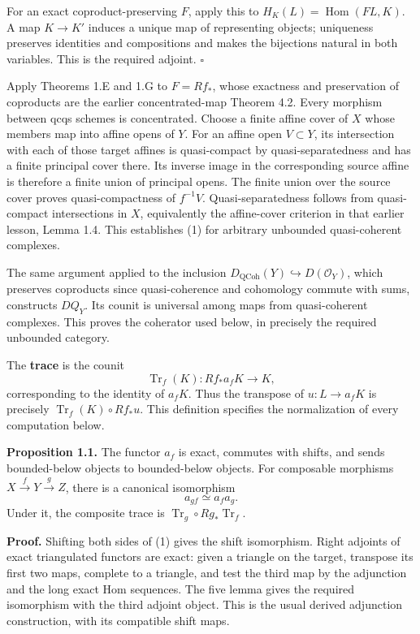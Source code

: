 \documentclass[11pt]{article}
\begin{document}
For an exact coproduct-preserving \(F\), apply this to
\(H_K(L)=\operatorname{Hom}(FL,K)\). A map \(K\to K'\) induces a unique
map of representing objects; uniqueness preserves identities and
compositions and makes the bijections natural in both variables. This is
the required adjoint. \(\square\)

Apply Theorems 1.E and 1.G to \(F=Rf_*\), whose exactness and
preservation of coproducts are the earlier concentrated-map Theorem 4.2.
Every morphism between qcqs schemes is concentrated. Choose a finite
affine cover of \(X\) whose members map into affine opens of \(Y\). For
an affine open \(V\subset Y\), its intersection with each of those
target affines is quasi-compact by quasi-separatedness and has a finite
principal cover there. Its inverse image in the corresponding source
affine is therefore a finite union of principal opens. The finite union
over the source cover proves quasi-compactness of \(f^{-1}V\).
Quasi-separatedness follows from quasi-compact intersections in \(X\),
equivalently the affine-cover criterion in that earlier lesson, Lemma
1.4. This establishes (1) for arbitrary unbounded quasi-coherent
complexes.

The same argument applied to the inclusion
\(D_{\mathrm{QCoh}}(Y)\hookrightarrow D(\mathcal O_Y)\), which preserves
coproducts since quasi-coherence and cohomology commute with sums,
constructs \(DQ_Y\). Its counit is universal among maps from
quasi-coherent complexes. This proves the coherator used below, in
precisely the required unbounded category.

The \textbf{trace} is the counit \[
\operatorname{Tr}_f(K):Rf_*a_fK\longrightarrow K,
\tag{2}
\] corresponding to the identity of \(a_fK\). Thus the transpose of
\(u:L\to a_fK\) is precisely \(\operatorname{Tr}_f(K)\circ Rf_*u\). This
definition specifies the normalization of every computation below.

\textbf{Proposition 1.1.} The functor \(a_f\) is exact, commutes with
shifts, and sends bounded-below objects to bounded-below objects. For
composable morphisms \(X\xrightarrow fY\xrightarrow gZ\), there is a
canonical isomorphism \[
a_{gf}\simeq a_fa_g.
\tag{3}
\] Under it, the composite trace is
\(\operatorname{Tr}_g\circ Rg_*\operatorname{Tr}_f\).

\textbf{Proof.} Shifting both sides of (1) gives the shift isomorphism.
Right adjoints of exact triangulated functors are exact: given a
triangle on the target, transpose its first two maps, complete to a
triangle, and test the third map by the adjunction and the long exact
Hom sequences. The five lemma gives the required isomorphism with the
third adjoint object. This is the usual derived adjunction construction,
with its compatible shift maps.
\end{document}
